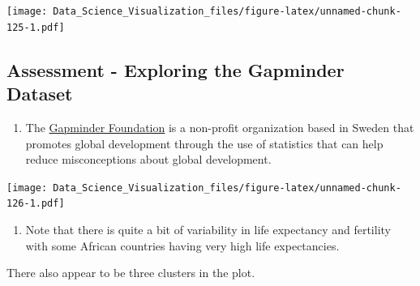 \documentclass[
]{article}
\newenvironment{Shaded}{\begin{snugshade}}{\end{snugshade}}
\newcommand{\CommentTok}[1]{\textcolor[rgb]{0.56,0.35,0.01}{\textit{#1}}}
\newcommand{\DataTypeTok}[1]{\textcolor[rgb]{0.13,0.29,0.53}{#1}}
\newcommand{\DecValTok}[1]{\textcolor[rgb]{0.00,0.00,0.81}{#1}}
\newcommand{\KeywordTok}[1]{\textcolor[rgb]{0.13,0.29,0.53}{\textbf{#1}}}
\newcommand{\NormalTok}[1]{#1}
\newcommand{\OperatorTok}[1]{\textcolor[rgb]{0.81,0.36,0.00}{\textbf{#1}}}
\newcommand{\StringTok}[1]{\textcolor[rgb]{0.31,0.60,0.02}{#1}}
\providecommand{\tightlist}{%
  \setlength{\itemsep}{0pt}\setlength{\parskip}{0pt}}
\begin{document}
\texttt{[image: Data\_Science\_Visualization\_files/figure-latex/unnamed-chunk-125-1.pdf]}

\hypertarget{assessment---exploring-the-gapminder-dataset}{%
\subsection{Assessment - Exploring the Gapminder
Dataset}\label{assessment---exploring-the-gapminder-dataset}}

\begin{enumerate}
\def\labelenumi{\arabic{enumi}.}
\tightlist
\item
  The \href{https://www.gapminder.org}{Gapminder Foundation} is a
  non-profit organization based in Sweden that promotes global
  development through the use of statistics that can help reduce
  misconceptions about global development.
\end{enumerate}

\begin{Shaded}
\end{Shaded}

\texttt{[image: Data\_Science\_Visualization\_files/figure-latex/unnamed-chunk-126-1.pdf]}

\begin{enumerate}
\def\labelenumi{\arabic{enumi}.}
\setcounter{enumi}{1}
\tightlist
\item
  Note that there is quite a bit of variability in life expectancy and
  fertility with some African countries having very high life
  expectancies.
\end{enumerate}

There also appear to be three clusters in the plot.

\begin{Shaded}
\end{Shaded}
\end{document}

